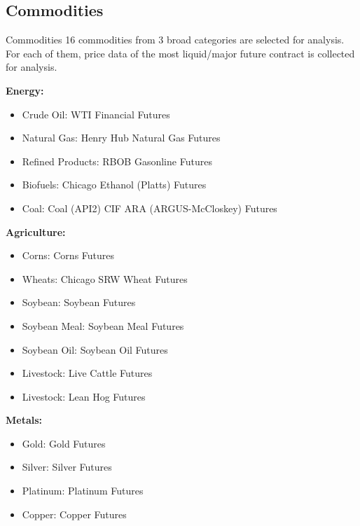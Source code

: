 \documentclass[8pt]{beamer}
\numberwithin{equation}{section}
\begin{document}
\subsection{Commodities}
\begin{frame}{Commodities}
16 commodities from 3 broad categories are selected for analysis. For each of them, price data of the most liquid/major future contract is collected for analysis.

\textbf{Energy:}
\begin{itemize}
	\item Crude Oil: WTI Financial Futures
	\item Natural Gas: Henry Hub Natural Gas Futures
	\item Refined Products: RBOB Gasonline Futures
	\item Biofuels: Chicago Ethanol (Platts) Futures
	\item Coal: Coal (API2) CIF ARA (ARGUS-McCloskey) Futures
\end{itemize}

\textbf{Agriculture:}
\begin{itemize}
	\item Corns: Corns Futures
	\item Wheats: Chicago SRW Wheat Futures
	\item Soybean: Soybean Futures
	\item Soybean Meal: Soybean Meal Futures
	\item Soybean Oil: Soybean Oil Futures
	\item Livestock: Live Cattle Futures
	\item Livestock: Lean Hog Futures
\end{itemize}

\textbf{Metals:}
\begin{itemize}
	\item Gold: Gold Futures
	\item Silver: Silver Futures
	\item Platinum: Platinum Futures
	\item Copper: Copper Futures
\end{itemize}
\end{frame}
\end{document}
